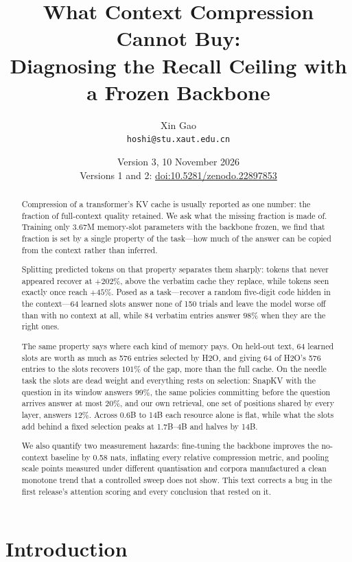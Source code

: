 \documentclass[11pt]{article}
\title{What Context Compression Cannot Buy:\\
       Diagnosing the Recall Ceiling with a Frozen Backbone}
\author{Xin Gao\\
  \texttt{hoshi@stu.xaut.edu.cn}}
\date{Version 3, 10 November 2026\\[3pt]
  {\small Versions 1 and 2: \href{https://doi.org/10.5281/zenodo.22897853}{doi:10.5281/zenodo.22897853}}}
\begin{document}
\maketitle

\begin{abstract}
Compression of a transformer's KV cache is usually reported as one number: the
fraction of full-context quality retained. We ask what the missing fraction is
made of. Training only 3.67M memory-slot parameters with the backbone frozen,
we find that fraction is set by a single property of the task---how much of the
answer can be copied from the context rather than inferred.

Splitting predicted tokens on that property separates them sharply: tokens that
never appeared recover at $+202\%$, above the verbatim cache they replace, while
tokens seen exactly once reach $+45\%$. Posed as a task---recover a random
five-digit code hidden in the context---64 learned slots answer none of 150
trials and leave the model worse off than with no context at all, while 84
verbatim entries answer $98\%$ when they are the right ones.

The same property says where each kind of memory pays. On held-out text, 64
learned slots are worth as much as 576 entries selected by H2O, and giving 64 of
H2O's 576 entries to the slots recovers $101\%$ of the gap, more than the full
cache. On the needle task the slots are dead weight and everything rests on
selection: SnapKV with the question in its window answers $99\%$, the same
policies committing before the question arrives answer at most $20\%$, and our
own retrieval, one set of positions shared by every layer, answers $12\%$.
Across 0.6B to 14B each resource alone is flat, while what the slots add behind
a fixed selection peaks at 1.7B--4B and halves by 14B.

We also quantify two measurement hazards: fine-tuning the backbone improves the
no-context baseline by 0.58 nats, inflating every relative compression metric,
and pooling scale points measured under different quantisation and corpora
manufactured a clean monotone trend that a controlled sweep does not show.
This text corrects a bug in the first release's attention scoring and every
conclusion that rested on it.
\end{abstract}

\section{Introduction}
\end{document}
